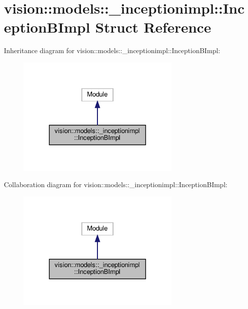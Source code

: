 \hypertarget{structvision_1_1models_1_1__inceptionimpl_1_1InceptionBImpl}{}\section{vision\+:\+:models\+:\+:\+\_\+inceptionimpl\+:\+:Inception\+B\+Impl Struct Reference}
\label{structvision_1_1models_1_1__inceptionimpl_1_1InceptionBImpl}


Inheritance diagram for vision\+:\+:models\+:\+:\+\_\+inceptionimpl\+:\+:Inception\+B\+Impl\+:
\nopagebreak
\begin{figure}[H]
\begin{center}
\leavevmode
\includegraphics[width=228pt]{structvision_1_1models_1_1__inceptionimpl_1_1InceptionBImpl__inherit__graph}
\end{center}
\end{figure}


Collaboration diagram for vision\+:\+:models\+:\+:\+\_\+inceptionimpl\+:\+:Inception\+B\+Impl\+:
\nopagebreak
\begin{figure}[H]
\begin{center}
\leavevmode
\includegraphics[width=228pt]{structvision_1_1models_1_1__inceptionimpl_1_1InceptionBImpl__coll__graph}
\end{center}
\end{figure}
